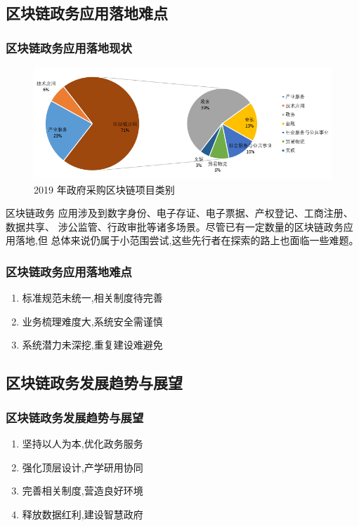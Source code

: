 \documentclass[11pt]{beamer}
\begin{document}
\subsection{区块链政务应用落地难点}
\begin{frame}
	\frametitle{区块链政务应用落地现状}
	\begin{figure}
		\centering
		\includegraphics[width=0.9\linewidth]{figures/gov/4}
		\caption{2019 年政府采购区块链项目类别}
		\label{fig:4}
	\end{figure}
	{\footnotesize 区块链政务
	应用涉及到数字身份、电子存证、电子票据、产权登记、工商注册、数据共享、
	涉公监管、行政审批等诸多场景。尽管已有一定数量的区块链政务应用落地,但
	总体来说仍属于小范围尝试,这些先行者在探索的路上也面临一些难题。}
\end{frame}

\begin{frame}
	\frametitle{区块链政务应用落地难点}
	\begin{enumerate}
		\item 标准规范未统一,相关制度待完善
		\item 业务梳理难度大,系统安全需谨慎
		\item 系统潜力未深挖,重复建设难避免
	\end{enumerate}
\end{frame}

\subsection{区块链政务发展趋势与展望}
\begin{frame}
	\frametitle{区块链政务发展趋势与展望}
	\begin{enumerate}
		\item 坚持以人为本,优化政务服务
		\item 强化顶层设计,产学研用协同
		\item 完善相关制度,营造良好环境
		\item 释放数据红利,建设智慧政府
	\end{enumerate}
\end{frame}
\end{document}
